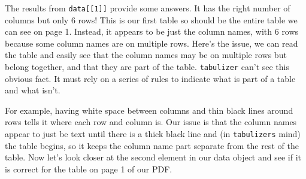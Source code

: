 \documentclass[
]{krantz}
\begin{document}
The results from \texttt{data{[}{[}1{]}{]}} provide some answers. It has the right number of columns but only 6 rows! This is our first table so should be the entire table we can see on page 1. Instead, it appears to be just the column names, with 6 rows because some column names are on multiple rows. Here's the issue, we can read the table and easily see that the column names may be on multiple rows but belong together, and that they are part of the table. \texttt{tabulizer} can't see this obvious fact. It must rely on a series of rules to indicate what is part of a table and what isn't.

For example, having white space between columns and thin black lines around rows tells it where each row and column is. Our issue is that the column names appear to just be text until there is a thick black line and (in \texttt{tabulizer\textquotesingle{}s} mind) the table begins, so it keeps the column name part separate from the rest of the table. Now let's look closer at the second element in our data object and see if it is correct for the table on page 1 of our PDF.
\end{document}
